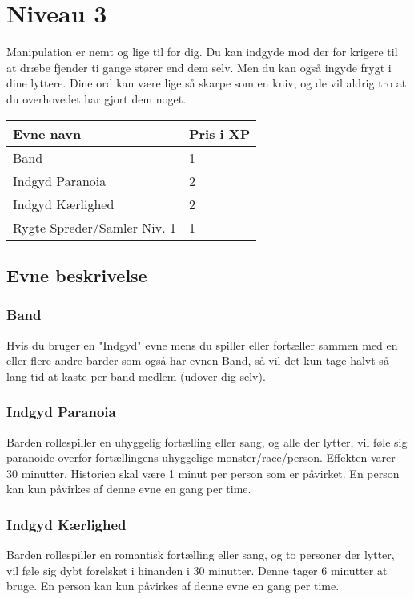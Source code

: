 \chapter{Niveau 3}
Manipulation er nemt og lige til for dig. Du kan indgyde mod der for krigere til at dræbe fjender ti gange stører end dem selv. Men du kan også ingyde frygt i dine lyttere. Dine ord kan være lige så skarpe som en kniv, og de vil aldrig tro at du overhovedet har gjort dem noget.

\begin{table}[H]
    \centering
    \begin{tabular}{|p{}|p{}|}
    \rowcolor{cerulean!80}\hline
        Evne navn & Pris i XP \\\hline
        Band & 1 \\\hline
        Indgyd Paranoia &2\\\hline
        Indgyd Kærlighed &2\\\hline
        Rygte Spreder/Samler Niv. 1 &1\\\hline
    \end{tabular}
\end{table}
\section*{Evne beskrivelse}

\subsection{Band}
Hvis du bruger en "Indgyd" evne mens du spiller eller fortæller sammen med en eller flere andre barder som også har evnen Band, så vil det kun tage halvt så lang tid at kaste per band medlem (udover dig selv).

\subsection{Indgyd Paranoia}
Barden rollespiller en uhyggelig fortælling eller sang, og alle der lytter, vil føle sig paranoide overfor fortællingens uhyggelige monster/race/person. Effekten varer 30 minutter. Historien skal være 1 minut per person som er påvirket. En person kan kun påvirkes af denne evne en gang per time.

\subsection{Indgyd Kærlighed}
Barden rollespiller en romantisk fortælling eller sang, og to personer der lytter, vil føle sig dybt forelsket i hinanden i 30 minutter. Denne tager 6 minutter at bruge. En person kan kun påvirkes af denne evne en gang per time.

